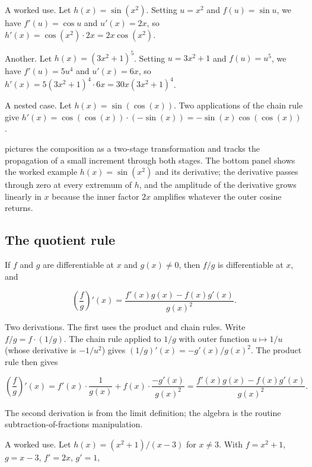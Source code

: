 A worked use. Let $h(x) = \sin(x^{2})$. Setting $u = x^{2}$ and
$f(u) = \sin u$, we have $f'(u) = \cos u$ and $u'(x) = 2 x$, so
$h'(x) = \cos(x^{2}) \cdot 2 x = 2 x \cos(x^{2})$.

Another. Let $h(x) = (3 x^{2} + 1)^{5}$. Setting $u = 3 x^{2} +
1$ and $f(u) = u^{5}$, we have $f'(u) = 5 u^{4}$ and $u'(x) = 6
x$, so $h'(x) = 5 (3 x^{2} + 1)^{4} \cdot 6 x = 30 x (3 x^{2} +
1)^{4}$.

A nested case. Let $h(x) = \sin(\cos(x))$. Two applications of
the chain rule give $h'(x) = \cos(\cos(x)) \cdot (-\sin(x)) =
-\sin(x) \cos(\cos(x))$.



 pictures the composition as a
two-stage transformation and tracks the propagation of a small
increment through both stages. The bottom panel shows the worked
example $h(x) = \sin(x^{2})$ and its derivative; the derivative
passes through zero at every extremum of $h$, and the amplitude
of the derivative grows linearly in $x$ because the inner factor
$2x$ amplifies whatever the outer cosine returns.

\subsection{The quotient rule}

\begin{theorem}
If $f$ and $g$ are differentiable at $x$ and $g(x) \neq 0$, then
$f / g$ is differentiable at $x$, and

\[
\left(\frac{f}{g}\right)'(x) = \frac{f'(x) g(x) - f(x) g'(x)}
{g(x)^{2}}.
\]
\end{theorem}

Two derivations. The first uses the product and chain rules. Write
$f / g = f \cdot (1/g)$. The chain rule applied to $1/g$ with outer
function $u \mapsto 1/u$ (whose derivative is $-1/u^{2}$) gives
$(1/g)'(x) = -g'(x) / g(x)^{2}$. The product rule then gives

\[
\left(\frac{f}{g}\right)'(x) = f'(x) \cdot \frac{1}{g(x)} + f(x)
\cdot \frac{-g'(x)}{g(x)^{2}} = \frac{f'(x) g(x) - f(x) g'(x)}
{g(x)^{2}}.
\]

The second derivation is from the limit definition; the algebra is
the routine subtraction-of-fractions manipulation.

A worked use. Let $h(x) = (x^{2} + 1) / (x - 3)$ for $x \neq 3$.
With $f = x^{2} + 1$, $g = x - 3$, $f' = 2 x$, $g' = 1$,

